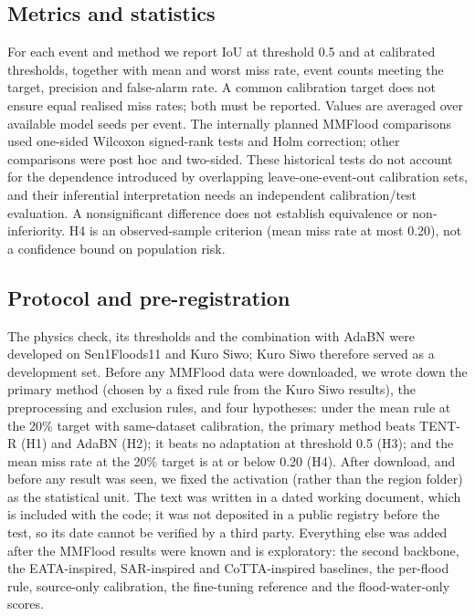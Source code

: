 \documentclass[a4paper,fleqn]{cas-sc}
\begin{document}
\subsection{Metrics and statistics}
For each event and method we report IoU at threshold 0.5 and at calibrated thresholds, together with mean and worst miss rate, event counts meeting the target, precision and false-alarm rate. A common calibration target does not ensure equal realised miss rates; both must be reported. Values are averaged over available model seeds per event. The internally planned MMFlood comparisons used one-sided Wilcoxon signed-rank tests and Holm correction; other comparisons were post hoc and two-sided. These historical tests do not account for the dependence introduced by overlapping leave-one-event-out calibration sets, and their inferential interpretation needs an independent calibration/test evaluation. A nonsignificant difference does not establish equivalence or non-inferiority. H4 is an observed-sample criterion (mean miss rate at most 0.20), not a confidence bound on population risk.

\subsection{Protocol and pre-registration}
The physics check, its thresholds and the combination with AdaBN were developed on Sen1Floods11 and Kuro Siwo; Kuro Siwo therefore served as a development set. Before any MMFlood data were downloaded, we wrote down the primary method (chosen by a fixed rule from the Kuro Siwo results), the preprocessing and exclusion rules, and four hypotheses: under the mean rule at the 20\% target with same-dataset calibration, the primary method beats TENT-R (H1) and AdaBN (H2); it beats no adaptation at threshold 0.5 (H3); and the mean miss rate at the 20\% target is at or below 0.20 (H4). After download, and before any result was seen, we fixed the activation (rather than the region folder) as the statistical unit. The text was written in a dated working document, which is included with the code; it was not deposited in a public registry before the test, so its date cannot be verified by a third party. Everything else was added after the MMFlood results were known and is exploratory: the second backbone, the EATA-inspired, SAR-inspired and CoTTA-inspired baselines, the per-flood rule, source-only calibration, the fine-tuning reference and the flood-water-only scores.

\end{document}
